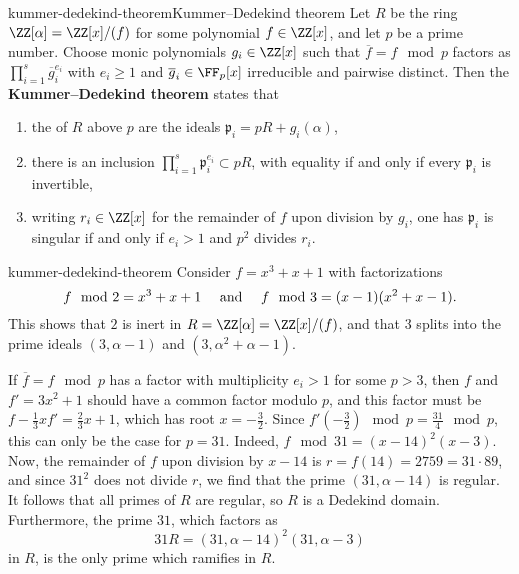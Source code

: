 \begin{topic}{kummer-dedekind-theorem}{Kummer--Dedekind theorem}
    Let $R$ be the ring $\ZZ[\alpha] = \ZZ[x] / (f)$ for some   polynomial $f \in \ZZ[x]$, and let $p$ be a prime number. Choose monic polynomials $g_i \in \ZZ[x]$ such that $\overline{f} = f \mod p$ factors as $\prod_{i = 1}^{s} \overline{g}_i^{e_i}$ with $e_i \ge 1$ and $\overline{g}_i \in \FF_p[x]$ irreducible and pairwise distinct. Then the \textbf{Kummer--Dedekind theorem} states that
    \begin{enumerate}[label=(\roman*)]
        \item the  of $R$ above $p$ are the ideals $\mathfrak{p}_i = pR + g_i(\alpha)$,
        \item there is an inclusion $\prod_{i = 1}^{s} \mathfrak{p}_i^{e_i} \subset pR$, with equality if and only if every $\mathfrak{p}_i$ is invertible,
        \item writing $r_i \in \ZZ[x]$ for the remainder of $f$ upon division by $g_i$, one has $\mathfrak{p}_i$ is singular if and only if $e_i > 1$ and $p^2$ divides $r_i$.
    \end{enumerate}
\end{topic}

\begin{example}{kummer-dedekind-theorem}
    Consider $f = x^3 + x + 1$ with factorizations
    \[ f \mod 2 = x^3 + x + 1 \quad \textup{ and } \quad f \mod 3 = (x - 1)(x^2 + x - 1) . \]
    This shows that $2$ is inert in $R = \ZZ[\alpha] = \ZZ[x] / (f)$, and that $3$ splits into the prime ideals $(3, \alpha - 1)$ and $(3, \alpha^2 + \alpha - 1)$.
    
    If $\overline{f} = f \mod p$ has a factor with multiplicity $e_i > 1$ for some $p > 3$, then $f$ and $f' = 3x^2 + 1$ should have a common factor modulo $p$, and this factor must be $f - \tfrac{1}{3} x f' = \tfrac{2}{3} x + 1$, which has root $x = - \tfrac{3}{2}$. Since $f'(-\tfrac{3}{2}) \mod p = \tfrac{31}{4} \mod p$, this can only be the case for $p = 31$. Indeed, $f \mod 31 = (x - 14)^2 (x - 3)$. Now, the remainder of $f$ upon division by $x - 14$ is $r = f(14) = 2759 = 31 \cdot 89$, and since $31^2$ does not divide $r$, we find that the prime $(31, \alpha - 14)$ is regular. It follows that all primes of $R$ are regular, so $R$ is a Dedekind domain. Furthermore, the prime $31$, which factors as
    \[ 31 R = (31, \alpha - 14)^2 (31, \alpha - 3) \]
    in $R$, is the only prime which ramifies in $R$.
\end{example}

